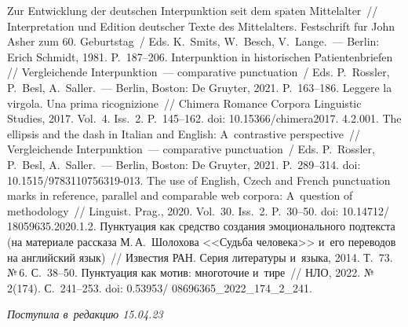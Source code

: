 \begin{multicols}{2}
{{\begin{thebibliography}{99}
 Zur Entwicklung der deutschen Interpunktion seit dem sp$\ddot{\mbox{a}}$ten Mittelalter~// 
Interpretation und Edition deutscher Texte des Mittelalters. Festschrift f$\ddot{\mbox{u}}$r John Asher zum 60. 
Geburtstag~/ Eds. K.~Smits, W.~Besch, V.~Lange.~--- Berlin: Erich Schmidt, 1981. P.~187--206.
 Interpunktion in historischen Patientenbriefen // Vergleichende
Interpunktion~--- comparative punctuation~/ Eds. P.~R$\ddot{\mbox{o}}$ssler, 
P.~Besl, A.~Saller.~--- Berlin, Boston: De Gruyter, 2021. P.~163--186.
 Leggere la virgola. Una prima ricognizione~// Chimera Romance Corpora 
Linguistic Studies, 2017. Vol.~4. Iss.~2. P.~145--162. doi: 
10.15366/chimera2017. 4.2.001.
 The ellipsis and the dash in Italian and English: A~contrastive 
perspective~// Vergleichende Interpunktion~--- comparative punctuation~/ Eds.
 P.~R$\ddot{\mbox{o}}$ssler, P.~Besl, A.~Saller.~--- Berlin, Boston: De Gruyter, 2021. P.~289--314.
 doi: 10.1515/9783110756319-013.
The use of English, Czech and French punctuation marks in reference, 
parallel and comparable web corpora: A~question of methodology~// 
Linguist. Prag.,  2020. Vol.~30. Iss.~2. P.~30--50. doi: 
10.14712/ 18059635.2020.1.2.
 Пунктуация как средство создания эмоционального под\-текс\-та (на 
материале рассказа М.\,А.~Шолохова <<Судьба человека>> и~его переводов на английский 
язык)~// Известия РАН. Серия литературы и~языка, 2014. Т.~73. №\,6. С.~38--50.
 Пунктуация как мотив: многоточие и~тире~// НЛО, 2022. №\,2(174). С.~241--253.
doi: 0.53953/ 08696365\_2022\_174\_2\_241.

\end{thebibliography}

 }
 }

\end{multicols}

\vspace*{-8pt}

\hfill{\small\textit{Поступила в~редакцию 15.04.23}}

\vspace*{6pt}




